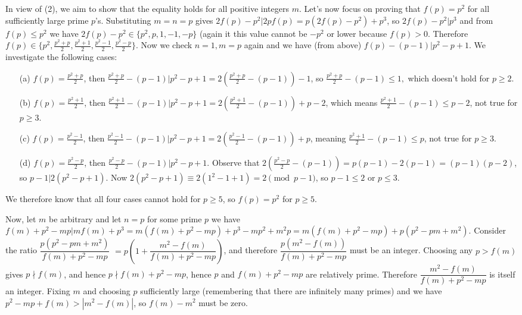 \documentclass[11pt,a4paper]{article}
\begin{document}
\begin{itemize}
In view of (2), we aim to show that the equality holds for all positive integers $m$. Let's now focus on proving that $f(p)=p^2$ for all sufficiently large prime $p$'s. 
Substituting $m=n=p$ gives $2f(p)-p^2|2pf(p)=p(2f(p)-p^2)+p^3$, so 
$2f(p)-p^2|p^3$ and from $f(p)\le p^2$ we have 
$2f(p)-p^2\in\{p^2, p, 1, -1, -p\}$ (again it this value cannot be $-p^2$ or lower because $f(p)>0$. 
Therefore $f(p)\in\{p^2, \frac{p^2+p}2, \frac{p^2+1}2, \frac{p^2-1}2, \frac{p^2-p}2\}$. 
Now we check $n=1, m=p$ again and we have (from above) $f(p)-(p-1)|p^2-p+1$. 
We investigate the following cases: 
\begin{itemize}
\item [(a)] $f(p)=\frac{p^2+p}2$, 
then $\frac{p^2+p}2-(p-1)|p^2-p+1=2(\frac{p^2+p}2-(p-1))-1$, 
so $\frac{p^2+p}2-(p-1)\le 1, $
which doesn't hold for $p\ge 2$. 

\item [(b)] $f(p)=\frac{p^2+1}2$, 
then $\frac{p^2+1}2-(p-1)|p^2-p+1=2(\frac{p^2+1}2-(p-1))+p-2$, 
which means $\frac{p^2+1}2-(p-1)\le p-2$, not true for $p\ge 3$. 

\item [(c)] $f(p)=\frac{p^2-1}2$, 
then $\frac{p^2-1}2-(p-1)|p^2-p+1=2(\frac{p^2-1}2-(p-1))+p$, 
meaning  $\frac{p^2+1}2-(p-1)\le p$, not true for $p\ge 3$. 

\item [(d)] $f(p)=\frac{p^2-p}2$, 
then $\frac{p^2-p}2-(p-1)|p^2-p+1$. 
Observe that $2(\frac{p^2-p}2-(p-1))=p(p-1)-2(p-1)=(p-1)(p-2)$, 
so $p-1|2(p^2-p+1)$. Now $2(p^2-p+1)\equiv 2(1^2-1+1)=2\pmod{p-1}$, 
so $p-1\le 2$ or $p\le 3$. 
\end{itemize}
We therefore know that all four cases cannot hold for $p\ge 5$, so $f(p)=p^2$ for $p\ge 5$. 

Now, let $m$ be arbitrary and let $n=p$ for some prime $p$ we have 
$f(m)+p^2-mp|mf(m)+p^3=m(f(m)+p^2-mp)+p^3-mp^2+m^2p=m(f(m)+p^2-mp)+p(p^2-pm+m^2)$. 
Consider the ratio $\dfrac{p(p^2-pm+m^2)}{f(m)+p^2-mp}$
$=p\left(1+\dfrac{m^2-f(m)}{f(m)+p^2-mp}\right)$, 
and therefore $\dfrac{p(m^2-f(m))}{f(m)+p^2-mp}$
must be an integer. 
Choosing any $p>f(m)$ gives 
$p\nmid f(m)$, and hence $p\nmid f(m)+p^2-mp$, hence $p$ and $f(m)+p^2-mp$ are relatively prime. 
Therefore $\dfrac{m^2-f(m)}{f(m)+p^2-mp}$ is itself an integer. 
Fixing $m$ and choosing $p$ sufficiently large (remembering that there are infinitely many primes) and we have $p^2-mp+f(m)>|m^2-f(m)|$, so $f(m)-m^2$ must be zero. 

\newpage 


\end{itemize}
\end{document}
